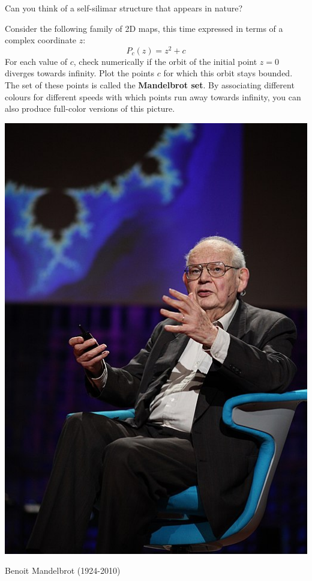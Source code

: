 \begin{exer}
Can you think of a self-silimar structure that appears in nature?
\end{exer}

\pagebreak

\begin{exer}
Consider the following family of 2D maps, this time expressed in terms of a complex coordinate $z$:
$$P_c(z)=z^2+c$$
For each value of $c$, check numerically if the orbit of the initial point $z=0$ diverges towards infinity. Plot the points $c$ for which this orbit stays bounded. The set of these points is called the \textbf{Mandelbrot set}. By associating different colours for different speeds with which points run away towards infinity, you can also produce full-color versions of this picture.
\end{exer}

\begin{marginfigure}[2cm]
\includegraphics{dynamic/figures/b_mandelbrot}
\caption{Benoit Mandelbrot (1924-2010)}
\end{marginfigure}

